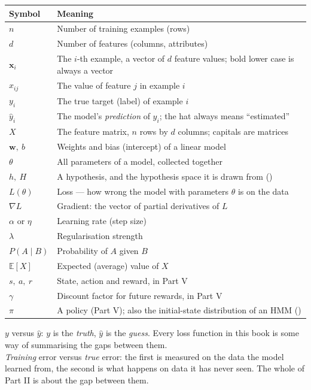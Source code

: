 \begin{longtable}{@{}L{2.8cm}L{12.4cm}@{}}
\toprule
{}
\textbf{Symbol} & \textbf{Meaning} \\
\midrule
\endhead
$n$ & Number of training examples (rows) \\
$d$ & Number of features (columns, attributes) \\
$\mathbf{x}_i$ & The $i$-th example, a vector of $d$ feature values; bold lower case is always a vector \\
$x_{ij}$ & The value of feature $j$ in example $i$ \\
$y_i$ & The true target (label) of example $i$ \\
$\hat{y}_i$ & The model's \emph{prediction} of $y_i$; the hat always means ``estimated'' \\
$X$ & The feature matrix, $n$ rows by $d$ columns; capitals are matrices \\
$\mathbf{w},\ b$ & Weights and bias (intercept) of a linear model \\
$\theta$ & All parameters of a model, collected together \\
$h,\ H$ & A hypothesis, and the hypothesis space it is drawn from () \\
$L(\theta)$ & Loss --- how wrong the model with parameters $\theta$ is on the data \\
$\nabla L$ & Gradient: the vector of partial derivatives of $L$ \\
$\alpha$ or $\eta$ & Learning rate (step size) \\
$\lambda$ & Regularisation strength \\
$P(A \mid B)$ & Probability of $A$ given $B$ \\
$\mathbb{E}[X]$ & Expected (average) value of $X$ \\
$s,\ a,\ r$ & State, action and reward, in Part V \\
$\gamma$ & Discount factor for future rewards, in Part V \\
$\pi$ & A policy (Part V); also the initial-state distribution of an HMM () \\
\bottomrule
\end{longtable}

\begin{alertbox}
$y$ versus $\hat{y}$: $y$ is the \emph{truth}, $\hat{y}$ is the \emph{guess}.
Every loss function in this book is some way of summarising the gaps between
them.\\[3pt]
\emph{Training} error versus \emph{true} error: the first is measured on the data
the model learned from, the second is what happens on data it has never seen.
The whole of Part II is about the gap between them.
\end{alertbox}

